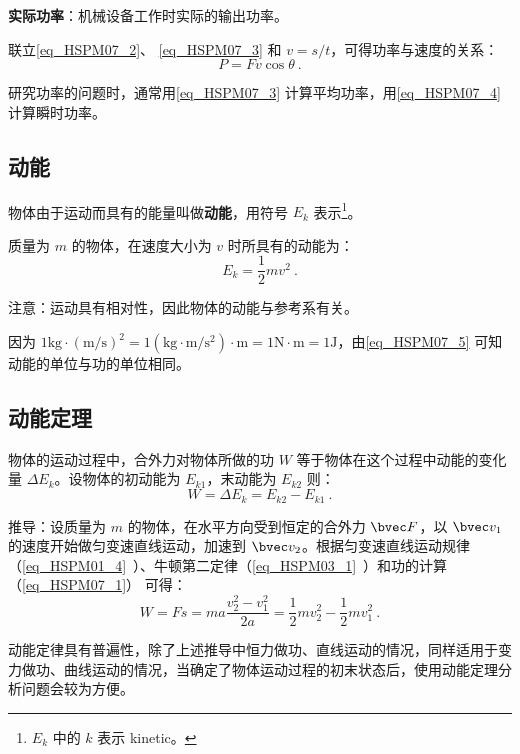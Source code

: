 \textbf{实际功率}：机械设备工作时实际的输出功率。

联立\autoref{eq_HSPM07_2}、 \autoref{eq_HSPM07_3} 和 $v=s/t$，可得功率与速度的关系：
\begin{equation}\label{eq_HSPM07_4}
P=Fv\cos \theta~.
\end{equation}

研究功率的问题时，通常用\autoref{eq_HSPM07_3} 计算平均功率，用\autoref{eq_HSPM07_4} 计算瞬时功率。

\subsection{动能}

物体由于运动而具有的能量叫做\textbf{动能}，用符号 $E_k$ 表示\footnote{$E_k$ 中的 $k$ 表示 kinetic。}。

质量为 $m$ 的物体，在速度大小为 $v$ 时所具有的动能为：
\begin{equation}\label{eq_HSPM07_5}
E_k=\frac12mv^2~.
\end{equation}

注意：运动具有相对性，因此物体的动能与参考系有关。

因为 $\mathrm{1kg\cdot (m/s)^2=1(kg\cdot m/s^2)\cdot m=1N\cdot m=1J}$，由\autoref{eq_HSPM07_5} 可知动能的单位与功的单位相同。

\subsection{动能定理}

物体的运动过程中，合外力对物体所做的功 $W$ 等于物体在这个过程中动能的变化量 $\Delta E_k$。设物体的初动能为 $E_{k1}$，末动能为 $E_{k2}$ 则：
\begin{equation}\label{eq_HSPM07_6}
W=\Delta E_k =E_{k2}-E_{k1}~.
\end{equation}

推导：设质量为 $m$ 的物体，在水平方向受到恒定的合外力 $\bvec F$，以 $\bvec v_1$ 的速度开始做匀变速直线运动，加速到 $\bvec v_2$。根据匀变速直线运动规律（\autoref{eq_HSPM01_4}~）、牛顿第二定律（\autoref{eq_HSPM03_1}~）和功的计算（\autoref{eq_HSPM07_1}） 可得：
\begin{equation}
W=Fs=ma\frac{v_2^2-v_1^2}{2a}=\frac12mv_2^2-\frac12mv_1^2~.
\end{equation}

动能定律具有普遍性，除了上述推导中恒力做功、直线运动的情况，同样适用于变力做功、曲线运动的情况，当确定了物体运动过程的初末状态后，使用动能定理分析问题会较为方便。


